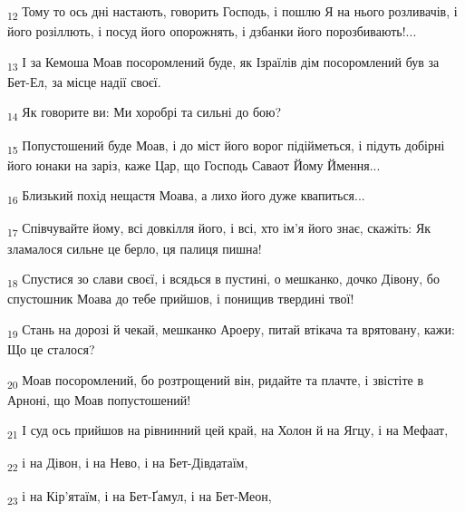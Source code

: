 \begin{tcolorbox}
\textsubscript{12} Тому то ось дні настають, говорить Господь, і пошлю Я на нього розливачів, і його розіллють, і посуд його опорожнять, і дзбанки його порозбивають!...
\end{tcolorbox}
\begin{tcolorbox}
\textsubscript{13} І за Кемоша Моав посоромлений буде, як Ізраїлів дім посоромлений був за Бет-Ел, за місце надії своєї.
\end{tcolorbox}
\begin{tcolorbox}
\textsubscript{14} Як говорите ви: Ми хоробрі та сильні до бою?
\end{tcolorbox}
\begin{tcolorbox}
\textsubscript{15} Попустошений буде Моав, і до міст його ворог підійметься, і підуть добірні його юнаки на заріз, каже Цар, що Господь Саваот Йому Ймення...
\end{tcolorbox}
\begin{tcolorbox}
\textsubscript{16} Близький похід нещастя Моава, а лихо його дуже квапиться...
\end{tcolorbox}
\begin{tcolorbox}
\textsubscript{17} Співчувайте йому, всі довкілля його, і всі, хто ім'я його знає, скажіть: Як зламалося сильне це берло, ця палиця пишна!
\end{tcolorbox}
\begin{tcolorbox}
\textsubscript{18} Спустися зо слави своєї, і всядься в пустині, о мешканко, дочко Дівону, бо спустошник Моава до тебе прийшов, і понищив твердині твої!
\end{tcolorbox}
\begin{tcolorbox}
\textsubscript{19} Стань на дорозі й чекай, мешканко Ароеру, питай втікача та врятовану, кажи: Що це сталося?
\end{tcolorbox}
\begin{tcolorbox}
\textsubscript{20} Моав посоромлений, бо розтрощений він, ридайте та плачте, і звістіте в Арноні, що Моав попустошений!
\end{tcolorbox}
\begin{tcolorbox}
\textsubscript{21} І суд ось прийшов на рівнинний цей край, на Холон й на Ягцу, і на Мефаат,
\end{tcolorbox}
\begin{tcolorbox}
\textsubscript{22} і на Дівон, і на Нево, і на Бет-Дівдатаїм,
\end{tcolorbox}
\begin{tcolorbox}
\textsubscript{23} і на Кір'ятаїм, і на Бет-Ґамул, і на Бет-Меон,
\end{tcolorbox}
